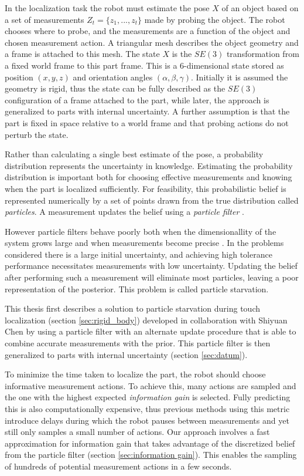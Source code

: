 \documentclass[../thesis.tex]{subfiles}
\begin{document}
In the localization task the robot must estimate the pose $X$ of an object based on a set of measurements $Z_t = \{z_1, ..., z_t\}$ made by probing the object.
The robot chooses where to probe, and the measurements are a function of the object and chosen measurement action.
A triangular mesh describes the object geometry and a frame is attached to this mesh. 
The state $X$ is the $SE(3)$ transformation from a fixed world frame to this part frame. 
This is a 6-dimensional state stored as position $(x,y,z)$ and orientation angles $(\alpha, \beta, \gamma)$. 
Initially it is assumed the geometry is rigid, thus the state can be fully described as the $SE(3)$ configuration of a frame attached to the part, while later, the approach is generalized to parts with internal uncertainty.
A further assumption is that the part is fixed in space relative to a world frame and that probing actions do not perturb the state. 

Rather than calculating a single best estimate of the pose, a probability distribution represents the uncertainty in knowledge.
Estimating the probability distribution is important both for choosing effective measurements and knowing when the part is localized sufficiently. 
For feasibility, this probabilistic belief is represented numerically by a set of points drawn from the true distribution called \textit{particles}. 
A measurement updates the belief using a \textit{particle filter} \cite{Thrun2000a}.

However particle filters behave poorly both when the dimensionallity of the system grows large and when measurements become precise \cite{Koval2013}. 
In the problems considered there is a large initial uncertainty, and achieving high tolerance performance necessitates measurements with low uncertainty.
Updating the belief after performing such a measurement will eliminate most particles, leaving a poor representation of the posterior. This problem is called particle starvation.

This thesis first describes a solution to particle starvation during touch localization (section \ref{sec:rigid_body}) developed in collaboration with Shiyuan Chen \cite{Saund2017} by using a particle filter with an alternate update procedure that is able to combine accurate measurements with the prior. 
This particle filter is then generalized to parts with internal uncertainty (section \ref{sec:datum}).

To minimize the time taken to localize the part, the robot should choose informative measurement actions.
To achieve this, many actions are sampled and the one with the highest expected \textit{information gain} is selected. 
Fully predicting this is also computationally expensive, thus previous methods using this metric introduce delays during which the robot pauses between measurements and yet still only samples a small number of actions.
Our approach involves a fast approximation for information gain that takes advantage of the discretized belief from the particle filter (section \ref{sec:information gain}). 
This enables the sampling of hundreds of potential measurement actions in a few seconds. 
\end{document}
